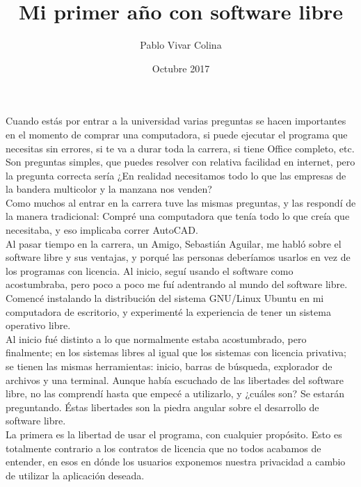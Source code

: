 \documentclass{article}
\title{Mi primer año con software libre}
\author{Pablo Vivar Colina}
\date{Octubre 2017}
\begin{document}
\maketitle




Cuando estás por entrar a la universidad varias preguntas se hacen importantes en el momento de comprar una computadora, si puede ejecutar el programa que necesitas sin errores, si te va a durar toda la carrera, si tiene Office completo, etc.\\

Son preguntas simples, que puedes resolver con relativa facilidad en internet, pero la pregunta correcta sería ¿En realidad necesitamos todo lo que las empresas de la bandera multicolor y la manzana nos %
venden?\\

 Como muchos al entrar en la carrera tuve las mismas preguntas, y las respondí de la manera tradicional: Compré una computadora que tenía todo lo que creía que necesitaba, y eso implicaba correr AutoCAD.\\
 
 Al pasar tiempo en la carrera, un Amigo, Sebastián Aguilar, me habló sobre el software libre y sus ventajas, y porqué las personas deberíamos usarlos en vez de los programas con licencia. Al inicio, seguí usando el software como acostumbraba, pero poco a poco me fuí adentrando al mundo del software libre. Comencé instalando la distribución del sistema GNU/Linux Ubuntu en mi computadora de escritorio, y experimenté la experiencia de tener un sistema operativo libre.\\
 
 Al inicio fué distinto a lo que normalmente estaba acostumbrado, pero finalmente; en los sistemas libres al igual que los sistemas con licencia privativa; se tienen las mismas herramientas: inicio, barras de búsqueda, explorador de archivos y una terminal. Aunque había escuchado de las libertades del software libre, no las comprendí hasta que empecé a utilizarlo, y ¿cuáles son? Se estarán preguntando. Éstas libertades son la piedra angular sobre el desarrollo de software libre.\\
 
 La primera es  la libertad de usar el programa, con cualquier propósito. Esto es totalmente contrario a los contratos de licencia que no todos acabamos de entender, en esos en dónde los usuarios exponemos nuestra privacidad a cambio de utilizar la aplicación deseada. 
 
\end{document}
